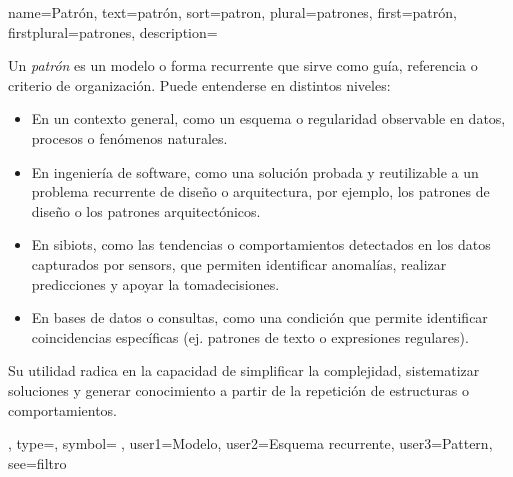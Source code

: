 	{
		name={Patr{\'o}n},
		text={patr{\'o}n},
		sort={patron},
		plural={patrones},
		first={patr{\'o}n},
		firstplural={patrones},
		description={Un \emph{patr{\'o}n} es un modelo o forma recurrente que sirve como gu{\'i}a, referencia o criterio de organizaci{\'o}n. Puede entenderse en distintos niveles:
			\begin{itemize}
				\item En un contexto general, como un esquema o regularidad observable en datos, procesos o fen{\'o}menos naturales.
				\item En ingenier{\'i}a de software, como una soluci{\'o}n probada y reutilizable a un problema recurrente de dise{\~n}o o arquitectura, por ejemplo, los patrones de dise{\~n}o o los patrones arquitect{\'o}nicos.
				\item En \glspl{sibiot}, como las tendencias o comportamientos detectados en los \glspl{dato} capturados por \glspl{sensor}, que permiten identificar anomal{\'i}as, realizar predicciones y apoyar la \gls{tomadecisiones}.
				\item En bases de datos o consultas, como una condici{\'o}n que permite identificar coincidencias espec{\'i}ficas (ej. patrones de texto o expresiones regulares).
			\end{itemize}
			Su utilidad radica en la capacidad de simplificar la complejidad, sistematizar soluciones y generar conocimiento a partir de la repetici{\'o}n de estructuras o comportamientos.},
		type=\glsdefaulttype,
		symbol={🔎},
		user1={Modelo},
		user2={Esquema recurrente},
		user3={Pattern},
		see={filtro}
	}
	
	
